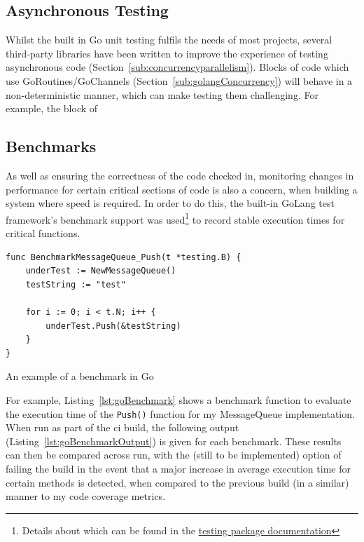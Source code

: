 \subsection{Asynchronous Testing}
\label{sub:asyncTesting}

Whilst the built in Go unit testing fulfils the needs of most projects, several
third-party libraries have been written to improve the experience of testing
asynchronous code (Section~\ref{sub:concurrencyparallelism}). Blocks of code
which use GoRoutines/GoChannels (Section~\ref{sub:golangConcurrency}) will
behave in a non-deterministic manner, which can make testing them challenging.
For example, the block of

\subsection{Benchmarks}
\label{sub:benchmarks}

As well as ensuring the correctness of the code checked in, monitoring changes
in performance for certain critical sections of code is also a concern, when
building a system where speed is required. In order to do this, the built-in
GoLang test framework's benchmark support was used\footnote{Details about which
can be found in the \href{https://golang.org/pkg/testing/}{testing package
documentation}} to record stable execution times for critical functions.

\begin{listing}
  \centering
  \begin{verbatim}
func BenchmarkMessageQueue_Push(t *testing.B) {
	underTest := NewMessageQueue()
	testString := "test"

	for i := 0; i < t.N; i++ {
		underTest.Push(&testString)
	}
}
  \end{verbatim}
  \caption{An example of a benchmark in Go}
  \label{lst:goBenchmark}
\end{listing}

For example, Listing~\ref{lst:goBenchmark} shows a benchmark function to
evaluate the execution time of the \texttt{Push()} function for my
MessageQueue implementation. When run as part of the \gls{ci} build, the
following output (Listing~\ref{lst:goBenchmarkOutput}) is given for each
benchmark. These results can then be compared across run, with the (still to be
implemented) option of failing the build in the event that a major increase in
average execution time for certain methods is detected, when compared to the
previous build (in a similar) manner to my code coverage metrics.

